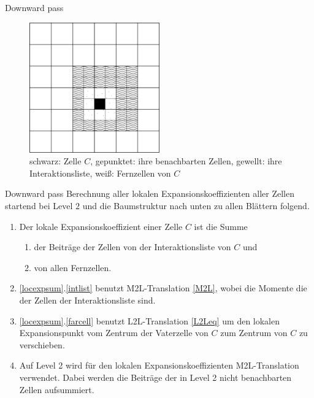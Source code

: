 \documentclass[ngerman]{beamer}
\begin{document}
\begin{frame}{Downward pass}
\begin{figure}
\includegraphics[width=0.5\textwidth]{intlist.png}
\caption{schwarz: Zelle $C$, gepunktet: ihre benachbarten Zellen, \linebreak gewellt: ihre Interaktionsliste, weiß: Fernzellen von $C$}
\end{figure}
\end{frame}

\begin{frame}{Downward pass}
Berechnung aller lokalen Expansionskoeffizienten aller Zellen startend bei Level $2$ und die Baumstruktur nach unten zu allen Blättern folgend.\\
\begin{enumerate}
\item\label{locexpsum} Der lokale Expansionskoeffizient einer Zelle $C$ ist die Summe 
\begin{enumerate} 
\item\label{intlist} der Beiträge der Zellen von der Interaktionsliste von $C$ und 
\item\label{farcell} von allen Fernzellen.
\end{enumerate}
\item \ref{locexpsum}.\ref{intlist} benutzt M2L-Translation \eqref{M2L}, wobei die Momente die der Zellen der Interaktionsliste sind.
\item \ref{locexpsum}.\ref{farcell} benutzt L2L-Translation \eqref{L2Leq} um den lokalen Expansionspunkt vom Zentrum der Vaterzelle von $C$ zum Zentrum von $C$ zu verschieben.
\item Auf Level 2 wird für den lokalen Expansionskoeffizienten M2L-Translation verwendet. Dabei werden die Beiträge der in Level 2 nicht benachbarten Zellen aufsummiert. 
\end{enumerate}
\end{frame}
\end{document}
